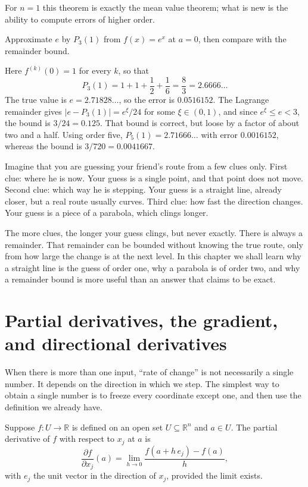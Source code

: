 For $n=1$ this theorem is exactly the mean value theorem; what is new is the ability to
compute errors of higher order.

\begin{contoh}
Approximate $e$ by $P_{3}(1)$ from $f(x)=e^{x}$ at $a=0$, then compare with the remainder
bound.
\end{contoh}

Here $f^{(k)}(0)=1$ for every $k$, so that
\[
  P_{3}(1)=1+1+\frac{1}{2}+\frac{1}{6}=\frac{8}{3}=2.6666\ldots
\]
The true value is $e=2.71828\ldots$, so the error is $0.0516152$. The Lagrange remainder
gives $|e-P_{3}(1)|=e^{\xi}/24$ for some $\xi\in(0,1)$, and since $e^{\xi}\le e<3$, the bound
is $3/24=0.125$. That bound is correct, but loose by a factor of about two and a half. Using
order five, $P_{5}(1)=2.71666\ldots$ with error $0.0016152$, whereas the bound is
$3/720=0.0041667$.

\begin{untukanak}
Imagine that you are guessing your friend's route from a few clues only. First clue: where he
is now. Your guess is a single point, and that point does not move. Second clue: which way he
is stepping. Your guess is a straight line, already closer, but a real route usually curves.
Third clue: how fast the direction changes. Your guess is a piece of a parabola, which clings
longer.

The more clues, the longer your guess clings, but never exactly. There is always a remainder.
That remainder can be bounded without knowing the true route, only from how large the change
is at the next level. In this chapter we shall learn why a straight line is the guess of order
one, why a parabola is of order two, and why a remainder bound is more useful than an answer
that claims to be exact.
\end{untukanak}
\section{Partial derivatives, the gradient, and directional derivatives}

When there is more than one input, ``rate of change'' is not necessarily a single number. It
depends on the direction in which we step. The simplest way to obtain a single number is to
freeze every coordinate except one, and then use the definition we already have.

\begin{definisi}
Suppose $f\colon U\to\mathbb{R}$ is defined on an open set
$U\subseteq\mathbb{R}^{n}$ and $a\in U$. The partial derivative of $f$ with respect to $x_{j}$
at $a$ is
\[
  \frac{\partial f}{\partial x_{j}}(a)
  =\lim_{h\to0}\frac{f(a+h\,e_{j})-f(a)}{h},
\]
with $e_{j}$ the unit vector in the direction of $x_{j}$, provided the limit exists.
\end{definisi}

